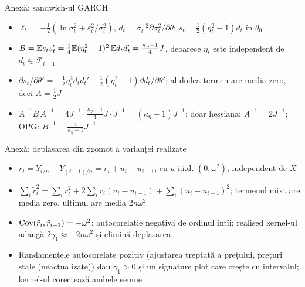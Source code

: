 \begin{frame}{Anexă: sandwich-ul GARCH}
\hypertarget{atsapp1}{}
\itemsize{\small}
\begin{itemize}
    \item $\ell_t = -\frac12(\ln\sigma^2_t + \varepsilon^2_t/\sigma^2_t)$, $d_t = \sigma_t^{-2}\partial\sigma^2_t/\partial\theta$: $s_t = \frac12(\eta^2_t - 1)d_t$ în $\theta_0$
    \item $B = \mathbb{E} s_ts_t' = \frac14\mathbb{E}(\eta^2_t - 1)^2\,\mathbb{E} d_td_t' = \frac{\kappa_\eta - 1}{4}J$, deoarece $\eta_t$ este independent de $d_t \in \mathcal F_{t-1}$
    \item $\partial s_t/\partial\theta' = -\frac12\eta^2_td_td_t' + \frac12(\eta^2_t - 1)\partial d_t/\partial\theta'$; al doilea termen are media zero, deci $A = \frac12J$
    \item $A^{-1}B\,A^{-1} = 4J^{-1}\cdot\frac{\kappa_\eta - 1}{4}J\cdot J^{-1} = (\kappa_\eta - 1)J^{-1}$; doar hessiana: $A^{-1} = 2J^{-1}$; OPG: $B^{-1} = \frac{4}{\kappa_\eta - 1}J^{-1}$
\end{itemize}
\end{frame}

\begin{frame}{Anexă: deplasarea din zgomot a varianței realizate}
\hypertarget{atsapp2}{}
\itemsize{\small}
\begin{itemize}
    \item $\tilde r_i = Y_{i/n} - Y_{(i-1)/n} = r_i + u_i - u_{i-1}$, cu $u$ i.i.d. $(0, \omega^2)$, independent de $X$
    \item $\sum_i\tilde r_i^2 = \sum_ir_i^2 + 2\sum_ir_i(u_i - u_{i-1}) + \sum_i(u_i - u_{i-1})^2$; termenul mixt are media zero, ultimul are media $2n\omega^2$
    \item $\text{Cov}(\tilde r_i, \tilde r_{i-1}) = -\omega^2$: autocorelație negativă de ordinul întîi; realised kernel-ul adaugă $2\gamma_1 \approx -2n\omega^2$ și elimină deplasarea
    \item Randamentele autocorelate pozitiv (ajustarea treptată a prețului, prețuri stale (neactualizate)) dau $\gamma_1 > 0$ și un signature plot care crește cu intervalul; kernel-ul corectează ambele semne
\end{itemize}
\end{frame}


